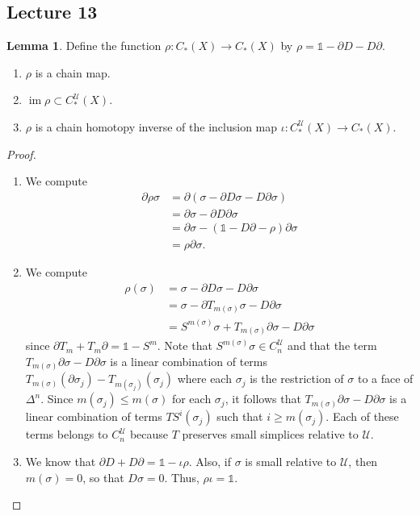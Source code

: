 \documentclass[10pt,letterpaper,cm]{nupset}
\theoremstyle{definition}
\theoremstyle{theorem}
\newtheorem{lemma}[definition]{Lemma}
\theoremstyle{remark}
\newcommand{\U}{\mathcal U}
\newcommand{\1}{\mathbb{1}}
\newcommand{\0}{\vec 0}
\DeclareMathOperator{\im}{im}
\begin{document}
\subsection{Lecture 13}

\begin{lemma} Define the function $\rho : C_{\ast}(X) \to C_{\ast}(X)$ by $\rho = \1 - \partial{D} - D{\partial}$.
\begin{enumerate}
\item $\rho$ is a chain map.
\item $\im{\rho}\subset C_{\ast}^{\U}(X)$. 
\item $\rho$ is a chain homotopy inverse of the inclusion map $\iota : C_{\ast}^{\U}(X) \to C_{\ast}(X)$.
\end{enumerate}
\end{lemma}
\begin{proof} $ $
\begin{enumerate}
\item We compute
\begin{align*}
\partial{\rho{\sigma}} & = \partial(\sigma - \partial{D}{\sigma} - D{\partial}{\sigma})
\\ & = \partial{\sigma} - \partial{D{\partial{\sigma}}}
\\ & = \partial{\sigma} -(\1 -D{\partial} -\rho){\partial{\sigma}}
\\ & = \rho{\partial{\sigma}}.
\end{align*}
\item We compute 
\begin{align*}
\rho(\sigma) & = \sigma - \partial{D}{\sigma} - D{\partial}{\sigma}
\\ & = \sigma - \partial{T_{m(\sigma)}}{\sigma} - D{\partial}{\sigma}
\\ & = S^{m(\sigma)}{\sigma}+T_{m(\sigma)}{\partial{\sigma}} - D{\partial{\sigma}}
\end{align*} since $\partial{T_m} +T_m{\partial} = \1 -S^m$.
Note that $ S^{m(\sigma)}{\sigma} \in C_n^{\U}$ and that the term $T_{m(\sigma)}{\partial{\sigma}} - D{\partial{\sigma}}$ is a linear combination of terms $T_{m(\sigma)}(\partial{\sigma_j}) -T_{m(\sigma_j)}(\sigma_j)$ where each $\sigma_j$  is the restriction of $\sigma$ to a face of $\Delta^n$. Since $m(\sigma_j)\leq m(\sigma)$ for each $\sigma_j$, it follows that $T_{m(\sigma)}{\partial{\sigma}} - D{\partial{\sigma}}$ is a linear combination of terms $TS^i(\sigma_j)$ such that $i\geq m(\sigma_j)$. Each of these terms belongs to $C_n^{\U}$ because $T$ preserves small simplices relative to $\U$.
\item We know that $\partial{D} + D{\partial} =\1 - \iota{\rho}$. Also, if $\sigma$ is small relative to $\U$, then $m(\sigma) =0$, so that $D{\sigma} = 0$. Thus, $\rho{\iota} = \1$.
\end{enumerate}
\end{proof}
\end{document}
